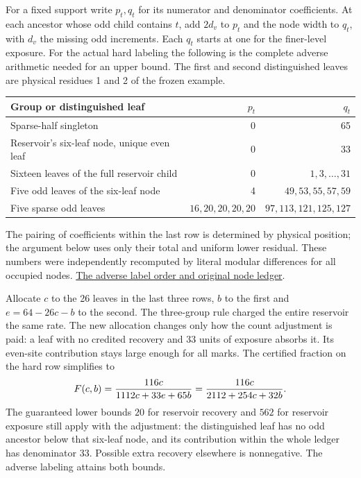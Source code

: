 \documentclass[12pt,letterpaper]{article}
\begin{document}
For a fixed support write \(p_t,q_t\) for its numerator and denominator coefficients. At each ancestor whose odd child contains \(t\), add \(2d_v\) to \(p_t\) and the node width to \(q_t\), with \(d_v\) the missing odd increments. Each \(q_t\) starts at one for the finer-level exposure. For the actual hard labeling the following is the complete adverse arithmetic needed for an upper bound. The first and second distinguished leaves are physical residues 1 and 2 of the frozen example.
\begin{center}
\begin{tabular}{lrr}
\toprule
Group or distinguished leaf & \(p_t\) & \(q_t\)\\
\midrule
Sparse-half singleton &0&65\\
Reservoir's six-leaf node, unique even leaf &0&33\\
Sixteen leaves of the full reservoir child &0&\(1,3,\ldots,31\)\\
Five odd leaves of the six-leaf node &4&\(49,53,55,57,59\)\\
Five sparse odd leaves &\(16,20,20,20,20\)&\(97,113,121,125,127\)\\
\bottomrule
\end{tabular}
\end{center}
The pairing of coefficients within the last row is determined by physical position; the argument below uses only their total and uniform lower residual. These numbers were independently recomputed by literal modular differences for all occupied nodes.
\href{https://github.com/nousentllc/riemann-hypothesis/blob/d67de1f6716496b98c8f0eb9f16b2a38c4f789c4/research/uriel/experiments/ten-percent-study/evidence/worked_example.json}{The adverse label order and original node ledger}.

Allocate \(c\) to the 26 leaves in the last three rows, \(b\) to the first and \(e=64-26c-b\) to the second. The three-group rule charged the entire reservoir the same rate. The new allocation changes only how the count adjustment is paid: a leaf with no credited recovery and 33 units of exposure absorbs it. Its even-site contribution stays large enough for all marks. The certified fraction on the hard row simplifies to
\begin{equation}
 F(c,b)={116c\over 1112c+33e+65b}
        ={116c\over2112+254c+32b}.
 \label{eq:fixed-free}
\end{equation}
The guaranteed lower bounds \(20\) for reservoir recovery and \(562\) for reservoir exposure still apply with the adjustment: the distinguished leaf has no odd ancestor below that six-leaf node, and its contribution within the whole ledger has denominator 33. Possible extra recovery elsewhere is nonnegative. The adverse labeling attains both bounds.
\end{document}
